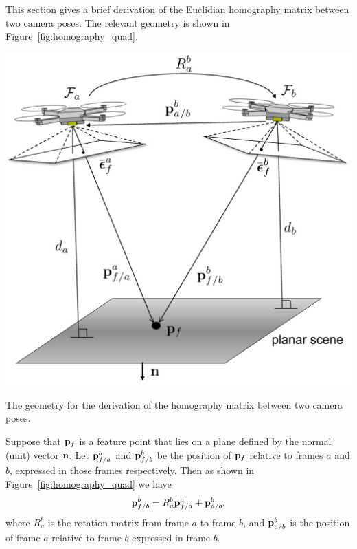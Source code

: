This section gives a brief derivation of the Euclidian homography matrix between two camera poses.  The relevant geometry is shown in Figure~\ref{fig:homography_quad}.  
\begin{marginfigure}
	\includegraphics[width=\linewidth]{chap10_tracking/figures/homography_quad.pdf} 
	\caption{The geometry for the derivation of the homography matrix between two camera poses.}
	\label{fig:homography_quad}
\end{marginfigure}
Suppose that $\mathbf{p}_f$ is a feature point that lies on a plane defined by the normal (unit) vector $\mathbf{n}$.  Let $\mathbf{p}_{f/a}^a$ and $\mathbf{p}_{f/b}^b$ be the position of $\mathbf{p}_f$ relative to frames $a$ and $b$, expressed in those frames respectively. Then as shown in Figure~\ref{fig:homography_quad} we have
\[
\mathbf{p}_{f/b}^b = R_a^b \mathbf{p}_{f/a}^a + \mathbf{p}_{a/b}^b,
\]
where $R_a^b$ is the rotation matrix from frame $a$ to frame $b$, and $\mathbf{p}_{a/b}^b$ is the position of frame $a$ relative to frame $b$ expressed in frame $b$.

